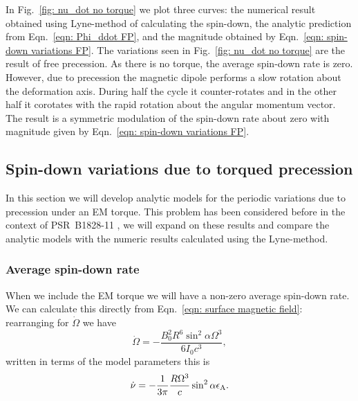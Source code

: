 \documentclass[../full_thesis/full_thesis.tex]{subfiles}
\begin{document}
In Fig.~\ref{fig: nu_dot no torque} we plot three curves: the numerical
result obtained using Lyne-method of calculating the spin-down, the analytic
prediction from Eqn.~\eqref{eqn: Phi_ddot FP}, and the magnitude obtained by
Eqn.~\eqref{eqn: spin-down variations FP}.
The variations seen in Fig.~\ref{fig: nu_dot no torque} are the result of
free precession. As there is no torque, the average spin-down rate is zero. However,
due to precession the magnetic dipole performs a slow rotation about the
deformation axis. During half the cycle it counter-rotates and in the other
half it corotates with the rapid rotation about the angular momentum vector.
The result is a symmetric modulation of the spin-down rate about zero with magnitude
given by Eqn.~\eqref{eqn: spin-down variations FP}.

\subsection{Spin-down variations due to torqued precession}
In this section we will develop analytic models for the periodic variations
due to precession under an EM torque. This problem has been considered before
in the context of PSR~B1828-11 \citep{Jones2001, Link2001, Akgun2006}, we will
expand on these results and compare the analytic models with the numeric
results calculated using the Lyne-method.

\subsubsection{Average spin-down rate}
When we include the EM torque we will have a non-zero average spin-down rate.
We can calculate this directly from Eqn.~\eqref{eqn: surface magnetic field}:
rearranging for $\dot{\Omega}$ we have
\begin{equation}
    \dot{\Omega} = -\frac{B_{0}^{2}R^{6} \sin^{2}\alpha \Omega^{3}}{6I_{0}c^{3}},
\end{equation}
written in terms of the model parameters this is
\begin{equation}
\dot{\nu} = -\frac{1}{3\pi}\frac{R \Omega^{3}}{c} \sin^{2}\alpha \epsilon_{\mathrm{A}}.
\end{equation}
\end{document}
